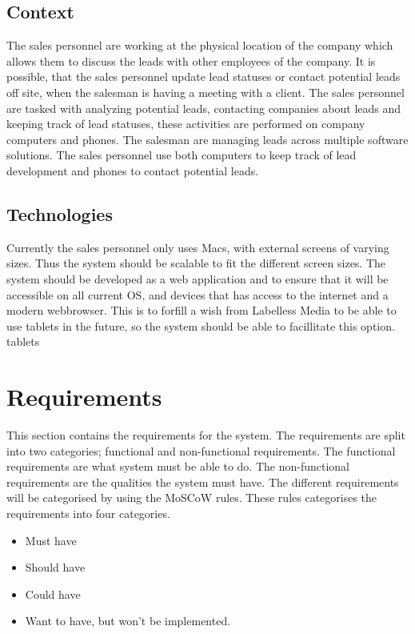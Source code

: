 \subsection{Context}
The sales personnel are working at the physical location of the company which allows them to discuss the leads with other employees of the company. It is possible, that the sales personnel update lead statuses or contact potential leads off site, when the salesman is having a meeting with a client. The sales personnel are tasked with analyzing potential leads, contacting companies about leads and keeping track of lead statuses, these activities are performed on company computers and phones. The salesman are managing leads across multiple software solutions.
The sales personnel use both computers to keep track of lead development and phones to contact potential leads.

\subsection{Technologies}
Currently the sales personnel only uses Macs, with external screens of varying sizes. Thus the system should be scalable to fit the different screen sizes. The system should be developed as a web application and to ensure that it will be accessible on all current OS, and devices that has access to the internet and a modern webbrowser. This is to forfill a wish from Labelless Media to be able to use tablets in the future, so the system should be able to facillitate this option. tablets


\section{Requirements}
This section contains the requirements for the system. The requirements are split into two categories; functional and non-functional requirements. The functional requirements are what system must be able to do. The non-functional requirements are the qualities the system must have. The different requirements will be categorised by using the MoSCoW rules. These rules categorises the requirements into four categories. 

\begin{itemize}
    \item Must have
    \item Should have
    \item Could have
    \item Want to have, but won't be implemented. 
\end{itemize}

